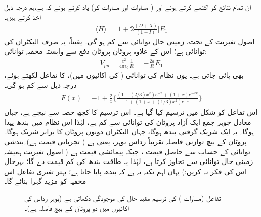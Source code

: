  ان تمام نتائج کو اکٹھے کرتے ہوئے اور ( مساوات  اور مساوات  کو) یاد کرتے
 ہوئے کہ  ہے،ہم درجہ ذیل اخذ کرتے ہیں۔
\begin{align}
\langle H \rangle =\big[1+2\frac{(D+X)}{(1+I)}\big]E_{1} 
\end{align}
 اصول تغیریت کے تحت، زمینی حال توانائی  سے کم ہو گی۔ یقیناً، یہ صرف الیکٹران کی توانائی ہے؛ اس کے علاوہ پروٹان پروٹان دفع سے وابستہ مخفیہ توانائی:
\begin{align}
V_{pp}=\frac{e^{2}}{4\pi\epsilon_{0}}\frac{1}{R}=-\frac{2a}{R}E_{1} 
\end{align}
 بھی پائی جاتی ہے۔ یوں نظام کی  توانائی (  کی اکائیوں میں)،  کا تفاعل لکھتے ہوئے، درجہ ذیل سے کم ہو گی۔
 \begin{align}\label{مساوات_تغیریت_کل_توانائی_اس_سے_کم}
F(x)=-1+\frac{2}{x}\Big\{\frac{(1-(2/3)x^{2})e^{-x}+(1+x)e^{-2x}}{1+(1+x+(1/3)x^{2})e^{-x}}\Big\} 
\end{align}
 اس تفاعل کو شکل  میں ترسیم کیا گیا ہے۔ اس ترسیم کا کچھ حصہ  سے نیچے ہے، جہاں معادل جوہر جمع ایک آزاد پروٹان کی 
 توانائی  سے کم ہے، لہٰذا اس نظام میں بندھ پیدا ہوگا۔ یہ ایک شریک گرفتی بندھ ہوگا، جہاں الیکٹران دونوں پروٹان کا برابر شریک ہوگا۔ پروٹان کے بیچ توازنی فاصلہ تقریباً  رداس بوہر، یعنی  ہے ( تجرباتی قیمت  ہے)۔بندشی توانائی کے حساب سے حاصل قیمت ، جبکہ پیمائشی قیمت  ہے ( اصول تغیریت ہمیشہ زمینی حال توانائی سے تجاوز کرتا ہے، لہٰذا یہ طاقت بندھ کی کم قیمت دے گا؛ بہرحال اس کی فکر نہ کریں:) یہاں اہم  نکتہ یہ ہے کہ بندھ پایا جاتا ہے؛ بہتر تغیری تفاعل اس مخفیہ کو مزید گہرا بنائے گا۔
\begin{figure} \centering
{} 
\caption{تفاعل  (مساوات ) کی ترسیم مقید حال کی موجودگی دکھاتی ہے (بوہر رداس کی اکائیوں میں  دو پروٹان کے بیچ فاصلہ ہے)۔ } 
\label{شکل_تغیریت_مقید_حال} 
\end{figure} 

